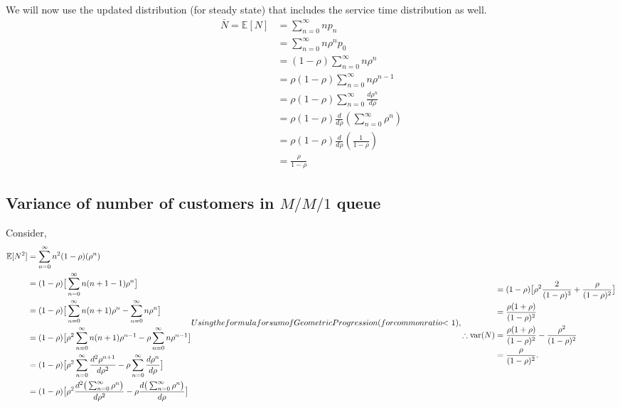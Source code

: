 \documentclass[11pt, a4paper]{report}
\begin{document}
We will now use the updated distribution (for steady state) that includes the service time distribution as well.
\begin{subequations}
    \begin{align}
        \bar{N} = \mathbb{E}[N] &= \sum_{n=0}^{\infty} n p_n \\
        &= \sum_{n=0}^{\infty} n \rho^n p_0 \\
        &= (1 - \rho) \sum_{n=0}^{\infty} n \rho^n \\
        &= \rho (1 - \rho) \sum_{n=0}^{\infty} n \rho^{n-1} \\
        &= \rho (1 - \rho) \sum_{n=0}^{\infty} \frac{d \rho^n}{d \rho} \\
        &= \rho (1 - \rho) \frac{d}{d \rho} \left( \sum_{n=0}^{\infty}  \rho^n \right) \\
        &= \rho(1 - \rho) \frac{d}{d \rho} \left( \frac{1}{1 - \rho} \right) \\
        &= \frac{\rho}{1 - \rho}
    \end{align}
    \label{eq:avgMM1}
\end{subequations}

\subsection{Variance of number of customers in $M/M/1$ queue}
Consider,
\begin{subequations}
    \begin{align}
        \ExpVal[N^2] &= \sum_{n=0}^{\infty} n^2 (1 - \rho)(\rho^n) \\
        &= (1 - \rho) \big[\sum_{n=0}^{\infty}n(n+1-1)\rho^n \big] \\
        &= (1 - \rho) \big[\sum_{n=0}^{\infty} n(n+1)\rho^n - \sum_{n=0}^{\infty}n\rho^n\big] \\
        &= (1 - \rho) \big[\rho^2 \sum_{n=0}^{\infty} n(n+1)\rho^{n-1} - \rho\sum_{n=0}^{\infty}n\rho^{n-1}\big] \\
        &= (1 - \rho) \big[\rho^2 \sum_{n=0}^{\infty} \frac{d^2\rho^{n+1}}{d\rho^2} - \rho\sum_{n=0}^{\infty}\frac{d\rho^{n}}{d \rho}\big] \\
        &= (1 - \rho) \big[\rho^2 \frac{d^2 \big(\sum_{n=0}^{\infty} \rho^n \big)}{d\rho^2} - \rho \frac{d \big(\sum_{n=0}^{\infty} \rho^n \big)}{d\rho}\big]
    \end{align}
    Using the formula for sum of Geometric Progression (for common ratio $< 1$),
    \begin{align}
        &= (1 - \rho) \big[ \rho^2 \frac{2}{(1-\rho)^3} + \frac{\rho}{(1 - \rho)^ 2}\big] \\
        &= \frac{\rho(1 + \rho)}{(1 - \rho)^ 2} \\
        \therefore \text{var}(N) &= \frac{\rho(1 + \rho)}{(1 - \rho)^ 2} - \frac{\rho^2}{(1 - \rho)^2} \\
        &= \frac{\rho}{(1 - \rho)^2}.
    \end{align} 
    \label{fig:varMM1}
\end{subequations}
\end{document}
